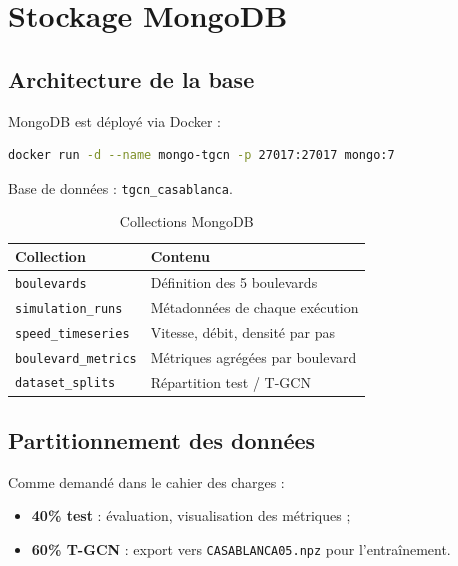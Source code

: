 \documentclass[12pt,a4paper]{report}
\begin{document}
\chapter{Stockage MongoDB}
\label{ch:mongodb}

\section{Architecture de la base}

MongoDB est déployé via Docker :
\begin{lstlisting}[language=bash]
docker run -d --name mongo-tgcn -p 27017:27017 mongo:7
\end{lstlisting}

Base de données : \texttt{tgcn\_casablanca}.

\begin{table}[H]
  \centering
  \caption{Collections MongoDB}
  \label{tab:mongo}
  \begin{tabular}{ll}
    \toprule
    Collection           & Contenu \\
    \midrule
    \texttt{boulevards}  & Définition des 5 boulevards \\
    \texttt{simulation\_runs} & Métadonnées de chaque exécution \\
    \texttt{speed\_timeseries} & Vitesse, débit, densité par pas \\
    \texttt{boulevard\_metrics} & Métriques agrégées par boulevard \\
    \texttt{dataset\_splits} & Répartition test / T-GCN \\
    \bottomrule
  \end{tabular}
\end{table}

\section{Partitionnement des données}

Comme demandé dans le cahier des charges :
\begin{itemize}
  \item \textbf{40\% test} : évaluation, visualisation des métriques ;
  \item \textbf{60\% T-GCN} : export vers \texttt{CASABLANCA05.npz} pour
        l'entraînement.
\end{itemize}
\end{document}
